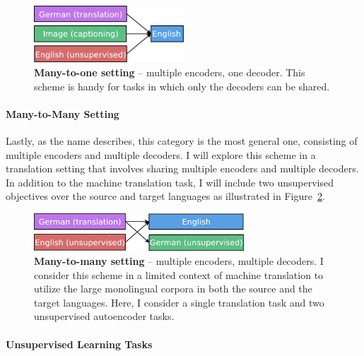 \begin{figure}[tbh]
\centering
\includegraphics[width=0.5\textwidth, clip=true, trim= 0 0 0
0]{img/6-1_mto}
\caption[Many-to-one setting]{{\bf Many-to-one setting} -- multiple encoders, one decoder. This scheme
is handy for tasks in which only the decoders can be shared.}
\label{f:mto}
\end{figure}

\paragraph{Many-to-Many Setting}
Lastly, as the name describes, this category is the most general one,
consisting of multiple encoders and multiple decoders.
I will explore this scheme in a translation setting that involves sharing multiple
encoders and multiple decoders.  In addition to the machine
translation task, I will include two unsupervised 
objectives over the source and target languages as illustrated in
Figure~\ref{f:mtm}.

\begin{figure}[tbh]
\centering
\includegraphics[width=0.7\textwidth, clip=true, trim= 0 0 0
0]{img/6-1_mtm}
\caption[Many-to-many setting]{{\bf Many-to-many setting} -- multiple encoders, multiple decoders. I
consider this scheme in a limited context of machine translation to utilize the large
monolingual corpora in both the source and the target languages. Here, I
consider a single translation task and two unsupervised autoencoder tasks.} 
\label{f:mtm}
\end{figure}

\paragraph{Unsupervised Learning Tasks}


